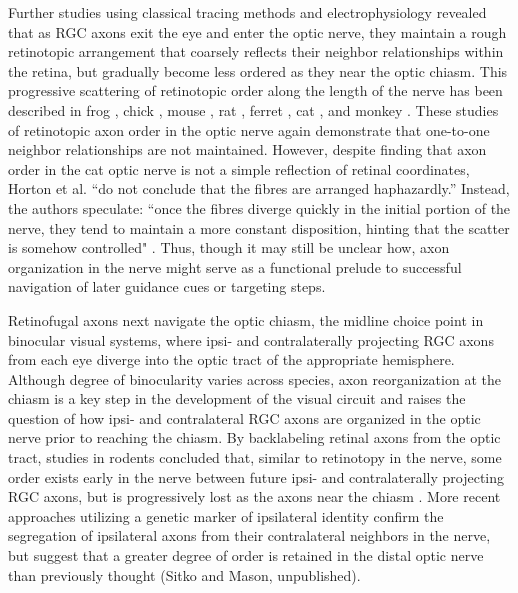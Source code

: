 Further studies using classical tracing methods and electrophysiology revealed that as RGC axons exit the eye and enter the optic nerve, they maintain a rough retinotopic arrangement that coarsely reflects their neighbor relationships within the retina, but gradually become less ordered as they near the optic chiasm. 
This progressive scattering of retinotopic order along the length of the nerve has been described in frog \cite{montgomery1998organization}, chick \cite{ehrlich1984course}, mouse \cite{chan1999changes, plas2005pretarget}, rat \cite{chan1994changes, simon1991relationship}, ferret \cite{reese1993reestablishment}, cat \cite{horton1979non, naito1986course}, and monkey \cite{naito1994retinogeniculate}. 
These studies of retinotopic axon order in the optic nerve again demonstrate that one-to-one neighbor relationships are not maintained.
However, despite finding that axon order in the cat optic nerve is not a simple reflection of retinal coordinates, Horton et al. “do not conclude that the fibres are arranged haphazardly.” 
Instead, the authors speculate: “once the fibres diverge quickly in the initial portion of the nerve, they tend to maintain a more constant disposition, hinting that the scatter is somehow controlled" \cite{horton1979non}. 
Thus, though it may still be unclear how, axon organization in the nerve might serve as a functional prelude to successful navigation of later guidance cues or targeting steps.

Retinofugal axons next navigate the optic chiasm, the midline choice point in binocular visual systems, where ipsi- and contralaterally projecting RGC axons from each eye diverge into the optic tract of the appropriate hemisphere.
Although degree of binocularity varies across species, axon reorganization at the chiasm is a key step in the development of the visual circuit and raises the question of how ipsi- and contralateral RGC axons are organized in the optic nerve prior to reaching the chiasm. 
By backlabeling retinal axons from the optic tract, studies in rodents concluded that, similar to retinotopy in the nerve, some order exists early in the nerve between future ipsi- and contralaterally projecting RGC axons, but is progressively lost as the axons near the chiasm \cite{baker1989distribution, colello1990early}. 
More recent approaches utilizing a genetic marker of ipsilateral identity confirm the segregation of ipsilateral axons from their contralateral neighbors in the nerve, but suggest that a greater degree of order is retained in the distal optic nerve than previously thought (Sitko and Mason, unpublished). 

